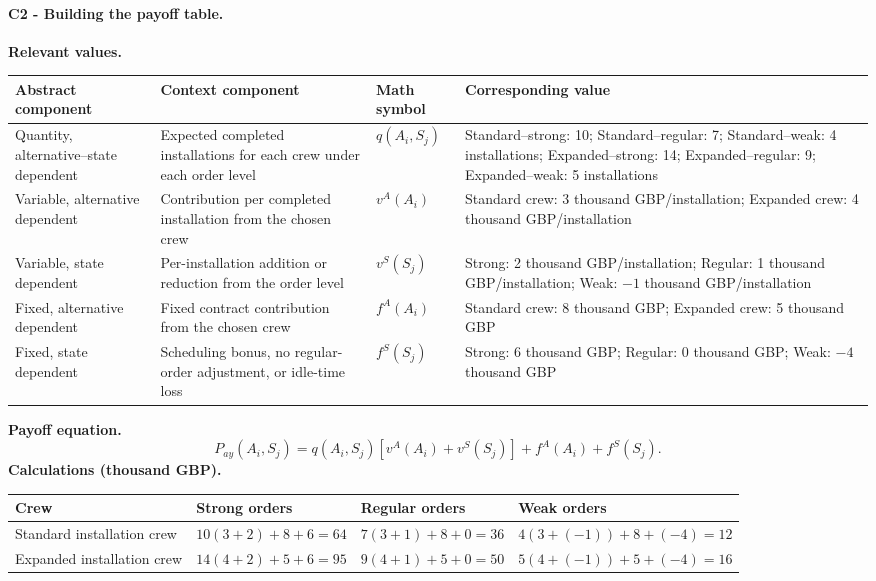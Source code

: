 	\paragraph*{C2 - Building the payoff table.}
	\label{subsec:problem5-solar-installation-crew-c2}
	\textbf{Relevant values.}
	\begin{center}
		\small
		\begin{tabularx}{\textwidth}{LLLL}
			\toprule
			Abstract component & Context component & Math symbol & Corresponding value \\
			\midrule
			Quantity, alternative--state dependent & Expected completed installations for each crew under each order level & $q(A_i,S_j)$ & Standard--strong: 10; Standard--regular: 7; Standard--weak: 4 installations; Expanded--strong: 14; Expanded--regular: 9; Expanded--weak: 5 installations \\
			Variable, alternative dependent & Contribution per completed installation from the chosen crew & $v^A(A_i)$ & Standard crew: 3 thousand GBP/installation; Expanded crew: 4 thousand GBP/installation \\
			Variable, state dependent & Per-installation addition or reduction from the order level & $v^S(S_j)$ & Strong: 2 thousand GBP/installation; Regular: 1 thousand GBP/installation; Weak: $-1$ thousand GBP/installation \\
			Fixed, alternative dependent & Fixed contract contribution from the chosen crew & $f^A(A_i)$ & Standard crew: 8 thousand GBP; Expanded crew: 5 thousand GBP \\
			Fixed, state dependent & Scheduling bonus, no regular-order adjustment, or idle-time loss & $f^S(S_j)$ & Strong: 6 thousand GBP; Regular: 0 thousand GBP; Weak: $-4$ thousand GBP \\
			\bottomrule
		\end{tabularx}
	\end{center}
	\textbf{Payoff equation.}
	\[
		P_{ay}(A_i,S_j)
		=q(A_i,S_j)\left[v^A(A_i)+v^S(S_j)\right]+f^A(A_i)+f^S(S_j).
	\]
	\textbf{Calculations (thousand GBP).}
	\begin{center}
		\small
		\begin{tabularx}{\textwidth}{L>{\centering\arraybackslash}X>{\centering\arraybackslash}X>{\centering\arraybackslash}X}
			\toprule
			Crew & Strong orders & Regular orders & Weak orders \\
			\midrule
			Standard installation crew & $10(3+2)+8+6=64$ & $7(3+1)+8+0=36$ & $4(3+(-1))+8+(-4)=12$ \\
			Expanded installation crew & $14(4+2)+5+6=95$ & $9(4+1)+5+0=50$ & $5(4+(-1))+5+(-4)=16$ \\
			\bottomrule
		\end{tabularx}
	\end{center}
